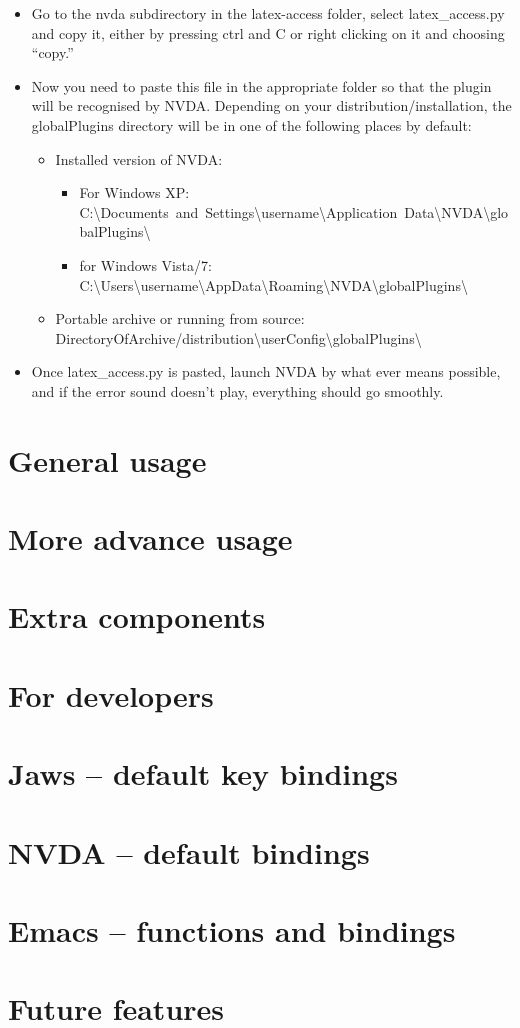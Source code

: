\documentclass[12pt,a4paper]{report}
\begin{document}
\begin{itemize}
\item Go to the nvda subdirectory in the latex-access folder, select latex\_access.py and copy it, either by pressing ctrl and C or right clicking on it and choosing ``copy.''
\item Now you need to paste this file in the appropriate folder so that the plugin will be recognised by NVDA.  Depending on your distribution/installation, the globalPlugins directory will be in one of the following places by default:
\begin{itemize}
\item Installed version of NVDA:
\begin{itemize}
\item For Windows XP:\\
\mbox{C:\textbackslash Documents and Settings\textbackslash username\textbackslash Application Data\textbackslash NVDA\textbackslash globalPlugins\textbackslash}
\item for Windows Vista/7:\\
\mbox{C:\textbackslash Users\textbackslash username\textbackslash AppData\textbackslash Roaming\textbackslash NVDA\textbackslash globalPlugins\textbackslash}
\end{itemize}
\item Portable archive or running from source:\\
\mbox{DirectoryOfArchive/distribution\textbackslash userConfig\textbackslash globalPlugins\textbackslash}
\end{itemize}
\item Once latex\_access.py is pasted, launch NVDA by what ever means possible, and if the error sound doesn't play, everything should go smoothly.
\end{itemize}

\chapter{General usage}
\label{ch-general-usage}
\chapter{More advance usage}
\label{ch-more-advanced-usage}
\chapter{Extra components}
\label{ch-extra-components}
\chapter{For developers}
\label{ch-for-developers}

\appendix
\chapter{Jaws -- default key bindings}
\label{ap-jaws}
\chapter{NVDA -- default bindings}
\label{ap-nvda}
\chapter{Emacs -- functions and bindings}
\label{AP-emacs}
\chapter{Future features}
\label{AP-future}
\end{document}
